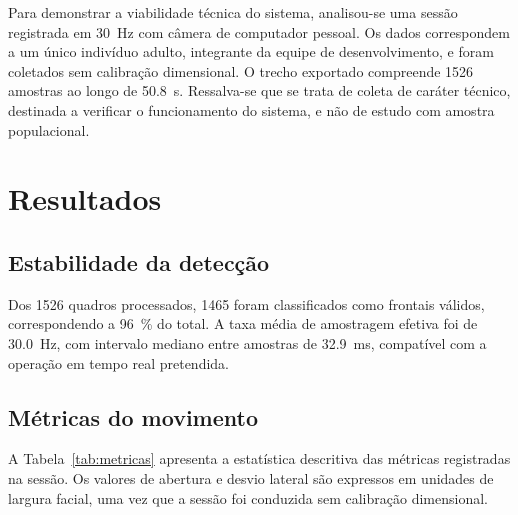 \documentclass[
    article,
    11pt,
    oneside,
    a4paper,
    english,
    brazil
]{abntex2}
\begin{document}
Para demonstrar a viabilidade técnica do sistema, analisou-se uma sessão
registrada em \SI{30}{\hertz} com câmera de computador pessoal. Os dados
correspondem a um único indivíduo adulto, integrante da equipe de
desenvolvimento, e foram coletados sem calibração dimensional. O trecho
exportado compreende \num{1526} amostras ao longo de \SI{50,8}{\second}.
Ressalva-se que se trata de coleta de caráter técnico, destinada a verificar
o funcionamento do sistema, e não de estudo com amostra populacional.

\section{Resultados}

\subsection{Estabilidade da detecção}

Dos \num{1526} quadros processados, \num{1465} foram classificados como
frontais válidos, correspondendo a \SI{96}{\percent} do total. A taxa média
de amostragem efetiva foi de \SI{30,0}{\hertz}, com intervalo mediano entre
amostras de \SI{32,9}{\milli\second}, compatível com a operação em tempo
real pretendida.

\subsection{Métricas do movimento}

A Tabela~\ref{tab:metricas} apresenta a estatística descritiva das métricas
registradas na sessão. Os valores de abertura e desvio lateral são
expressos em unidades de largura facial, uma vez que a sessão foi conduzida
sem calibração dimensional.
\end{document}
